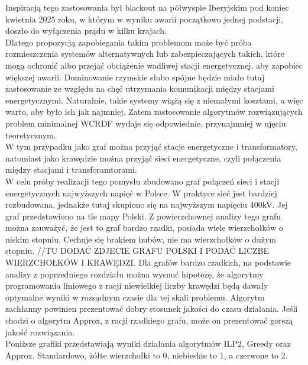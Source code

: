Inspiracją tego zastosowania był blackout na półwyspie Iberyjskim pod koniec kwietnia 2025 roku\cite{BLACKOUT}, w którym w wyniku awarii początkowo jednej podstacji, doszło do wyłączenia prądu w kilku krajach. \\
Dlatego propozycją zapobiegania takim problemom może być próba rozmieszczenia systemów alternatywnych lub zabezpieczających takich, które mogą ochronić albo przejąć obciążenie wadliwej stacji energetycznej, aby zapobiec większej awarii. Dominowanie rzymskie słabo spójne będzie miało tutaj zastosowanie ze względu na chęć utrzymania komunikacji między stacjami energetycznymi. Naturalnie, takie systemy wiążą się z niemałymi kosztami, a więc warto, aby było ich jak najmniej. Zatem zastosowanie algorytmów rozwiązujących problem minimalnej WCRDF wydaje się odpowiednie, przynajmniej w ujęciu teoretycznym.\\
W tym przypadku jako graf można przyjąć stacje energetyczne i transformatory, natomiast jako krawędzie można przyjąć sieci energetyczne, czyli połączenia między stacjami i transforamtorami.\\
W celu próby realizacji tego pomysłu zbudowano graf połączeń sieci i stacji energetycznych najwyższych napięć w Polsce\cite{POLAND}. W praktyce sieć jest bardziej rozbudowana, jednakże tutaj skupiono się na najwyższym napięciu 400kV. Jej graf przedstawiono na tle mapy Polski. Z powierzchownej analizy tego grafu można zauważyć, że jest to graf bardzo rzadki, posiada wiele wierzchołków o niskim stopniu. Cechuje się brakiem hubów, nie ma wierzchołków o dużym stopniu.
//TU DODAĆ ZDJECIE GRAFU POLSKI I PODAĆ LICZBE WIERZCHOŁKÓW I KRAWĘDZI.
Dla grafów bardzo rzadkich, na podstawie analizy z poprzedniego rozdziału można wysnuć hipotezę, że algorytmy programowania liniowego z racji niewielkiej liczby krawędzi będą dawały optymalne wyniki w rozsądnym czasie dla tej skali problemu. Algorytm zachłanny powinien prezentować dobry stosunek jakości do czasu działania. Jeśli chodzi o algorytm Approx, z racji rzadkiego grafu, może on prezentować gorszą jakość rozwiązania.\\

Poniższe grafiki przedstawiają wyniki działania algorytmów ILP2, Greedy oraz Approx. Standardowo, żółte wierzchołki to 0, niebieskie to 1, a czerwone to 2.

